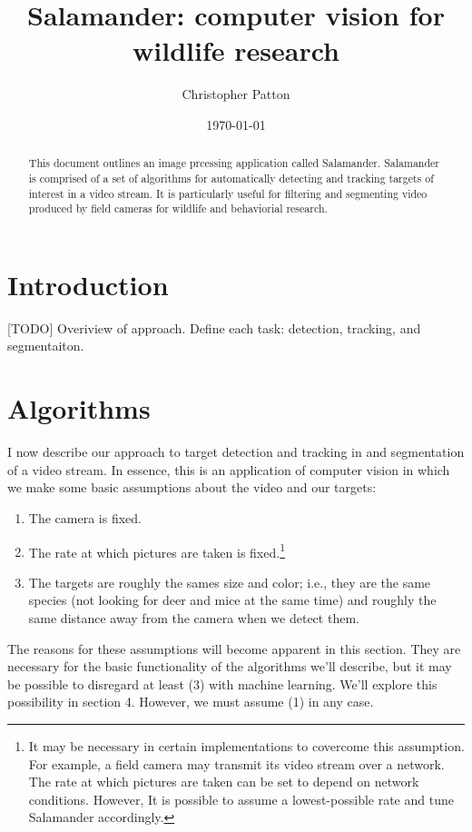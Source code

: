 \documentclass[letter]{article}
\author{Christopher Patton}
\date{\today}
\title{Salamander: computer vision for wildlife research}
\newcounter{foot}
\begin{document}
\maketitle

\begin{abstract}
This document outlines an image prcessing application called Salamander. Salamander
is comprised of a set of algorithms for automatically detecting and tracking 
targets of interest in a video stream. It is particularly useful for filtering 
and segmenting video produced by field cameras for wildlife and behaviorial 
research. 
\end{abstract}

\tableofcontents
\pagebreak 

\section{Introduction}
[TODO] Overiview of approach. Define each task: detection, tracking, and segmentaiton. 

\section{Algorithms}
I now describe our approach to target detection and tracking in and segmentation of 
a video stream. In essence, this is an application of computer vision in which we 
make some basic assumptions about the video and our targets: 
\begin{enumerate}
  \item The camera is fixed. 
  
  \item The rate at which pictures are taken is fixed.\footnote{It may be necessary
   in certain implementations to covercome this assumption. For example, a field 
   camera may transmit its video stream over a network. The rate at which pictures 
   are taken can be set to depend on network conditions. However, It is possible to 
   assume a lowest-possible rate and tune Salamander accordingly.}

  \item The targets are roughly the sames size and color; i.e., they are the same 
   species (not looking for deer and mice at the same time) and roughly the same distance 
   away from the camera when we detect them.
\end{enumerate}

The reasons for these assumptions will become apparent in this section. They are 
necessary for the basic functionality of the algorithms we'll describe, but it may
be possible to disregard at least (3) with machine learning. We'll explore this 
possibility in section 4. However, we must assume (1) in any case. 
\end{document}
